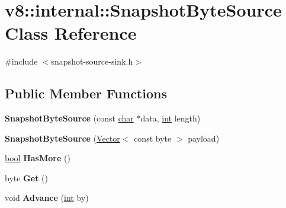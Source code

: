 \hypertarget{classv8_1_1internal_1_1SnapshotByteSource}{}\section{v8\+:\+:internal\+:\+:Snapshot\+Byte\+Source Class Reference}
\label{classv8_1_1internal_1_1SnapshotByteSource}


{\ttfamily \#include $<$snapshot-\/source-\/sink.\+h$>$}

\subsection*{Public Member Functions}
\begin{DoxyCompactItemize}
\item 
\mbox{\label{classv8_1_1internal_1_1SnapshotByteSource_aaec870afee9a0ee4db260e5d6d96871a}} 
{\bfseries Snapshot\+Byte\+Source} (const \mbox{\hyperlink{classchar}{char}} $\ast$data, \mbox{\hyperlink{classint}{int}} length)
\item 
\mbox{\label{classv8_1_1internal_1_1SnapshotByteSource_a3ca81e1446facca52cb592dbe5b13a05}} 
{\bfseries Snapshot\+Byte\+Source} (\mbox{\hyperlink{classv8_1_1internal_1_1Vector}{Vector}}$<$ const byte $>$ payload)
\item 
\mbox{\label{classv8_1_1internal_1_1SnapshotByteSource_a957126cd1402ae66976d00619fbff992}} 
\mbox{\hyperlink{classbool}{bool}} {\bfseries Has\+More} ()
\item 
\mbox{\label{classv8_1_1internal_1_1SnapshotByteSource_a02a021e250f8092eec60a678154941fa}} 
byte {\bfseries Get} ()
\item 
\mbox{\label{classv8_1_1internal_1_1SnapshotByteSource_a0a711417dc223373cb5b3b6468ceb51a}} 
void {\bfseries Advance} (\mbox{\hyperlink{classint}{int}} by)
\item 
\mbox{\label{classv8_1_1internal_1_1SnapshotByteSource_a562e8c45079d9b9f73e6e1f125414191}} 

\end{DoxyCompactItemize}
